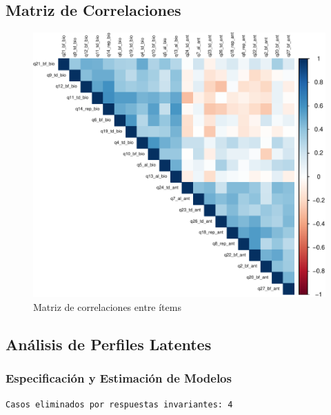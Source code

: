 \documentclass[
  11pt,
  letterpaper,
  DIV=11,
  numbers=noendperiod]{scrartcl}
\begin{document}
\subsection{Matriz de Correlaciones}\label{matriz-de-correlaciones}

\begin{figure}[H]

{\centering \includegraphics[width=1\linewidth,height=\textheight,keepaspectratio]{analisis_perfiles_latentes_pdf_files/figure-pdf/correlaciones-1.pdf}

}

\caption{Matriz de correlaciones entre ítems}

\end{figure}%

\newpage

\subsection{Análisis de Perfiles
Latentes}\label{anuxe1lisis-de-perfiles-latentes}

\subsubsection{Especificación y Estimación de
Modelos}\label{especificaciuxf3n-y-estimaciuxf3n-de-modelos}

\begin{verbatim}
Casos eliminados por respuestas invariantes: 4 
\end{verbatim}
\end{document}
